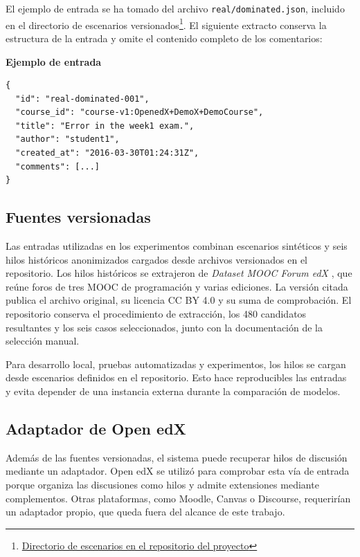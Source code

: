El ejemplo de entrada se ha tomado del archivo \texttt{real/dominated.json}, incluido en el directorio de escenarios versionados\footnote{\href{https://github.com/magrimal/tfm-2026-discussion-moderation/tree/main/docs/threads}{Directorio de escenarios en el repositorio del proyecto}}. El siguiente extracto conserva la estructura de la entrada y omite el contenido completo de los comentarios:

\textbf{Ejemplo de entrada}

\begin{samepage}
\begin{small}
\begin{verbatim}
{
  "id": "real-dominated-001",
  "course_id": "course-v1:OpenedX+DemoX+DemoCourse",
  "title": "Error in the week1 exam.",
  "author": "student1",
  "created_at": "2016-03-30T01:24:31Z",
  "comments": [...]
}
\end{verbatim}
\end{small}
\end{samepage}

\subsection{Fuentes versionadas}

Las entradas utilizadas en los experimentos combinan escenarios sintéticos y seis hilos históricos anonimizados cargados desde archivos versionados en el repositorio. Los hilos históricos se extrajeron de \textit{Dataset MOOC Forum edX} \parencite{AlarioHoyos2021Dataset}, que reúne foros de tres MOOC de programación y varias ediciones. La versión citada publica el archivo original, su licencia CC BY 4.0 y su suma de comprobación. El repositorio conserva el procedimiento de extracción, los 480 candidatos resultantes y los seis casos seleccionados, junto con la documentación de la selección manual.

Para desarrollo local, pruebas automatizadas y experimentos, los hilos se cargan desde escenarios definidos en el repositorio. Esto hace reproducibles las entradas y evita depender de una instancia externa durante la comparación de modelos.

\subsection{Adaptador de Open edX}

Además de las fuentes versionadas, el sistema puede recuperar hilos de discusión mediante un adaptador. Open edX se utilizó para comprobar esta vía de entrada porque organiza las discusiones como hilos y admite extensiones mediante complementos. Otras plataformas, como Moodle, Canvas o Discourse, requerirían un adaptador propio, que queda fuera del alcance de este trabajo.

